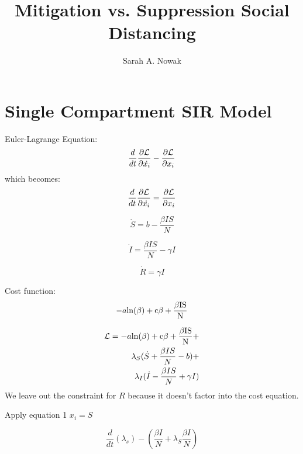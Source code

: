 \documentclass[11pt]{article} %
\title{Mitigation vs. Suppression Social Distancing}
\author{Sarah A. Nowak}
\date{} %
\begin{document}
\maketitle

\section{Single Compartment SIR Model}

Euler-Lagrange Equation:
\begin{equation}
\frac{d}{dt} \frac{\partial \cal{L}}{\partial {\dot{x_i}}}-\frac{\partial \cal{L}}{\partial x_i}
\end{equation}
 which becomes:
\begin{equation}
\frac{d}{dt} \frac{\partial \cal{L}}{\partial {\dot{x_i}}}=\frac{\partial \cal{L}}{\partial x_i}
\end{equation}


\begin{equation}
\dot{S}= b-\frac{\beta IS}{N}
\end{equation}



\begin{equation}
\dot{I}=\frac{\beta IS}{N}-\gamma I
\label{eq:didt}
\end{equation}

\begin{equation}
\dot{R}=\gamma I
\end{equation}

Cost function:
\begin{equation}
-a\rm{ln}({\beta})+c\beta+\frac{\beta IS}{N}
\end{equation}

\begin{equation}
\begin{split}
\mathcal{L} = -a \rm {ln}({\beta})+c\beta+\frac{\beta IS}{N} +\\
\lambda_S(\dot{S} +\frac{\beta IS}{N}-b)+\\
\lambda_I(\dot{I}-\frac{\beta IS}{N}+\gamma I)
\end{split}
\end{equation}
We leave out the constraint for $R$ because it doesn't factor into the cost equation.

Apply equation 1 $x_i = S$

\begin{equation}
\frac{d}{dt}\left(\lambda_s \right)-\left(\frac{\beta I}{N}+\lambda_S \frac{\beta I}{N}\right)
\end{equation}
\end{document}
